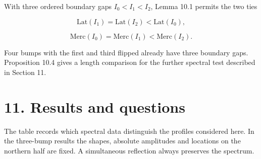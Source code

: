 \documentclass[11pt,letterpaper]{article}
\begin{document}
With three ordered boundary gaps \(I_0<I_1<I_2\), Lemma 10.1 permits the two ties

\[\mathrm{Lat}(I_1)=\mathrm{Lat}(I_2)<\mathrm{Lat}(I_0),\]

\[\mathrm{Merc}(I_0)=\mathrm{Merc}(I_1)<\mathrm{Merc}(I_2).\]

Four bumps with the first and third flipped already have three boundary gaps. Proposition
10.4 gives a length comparison for the further spectral test described in Section 11.

\section{11. Results and questions}\label{results-and-questions}

The table records which spectral data distinguish the profiles considered here. In the
three-bump results the shapes, absolute amplitudes and locations on the northern half are
fixed. A simultaneous reflection always preserves the spectrum.
\end{document}
